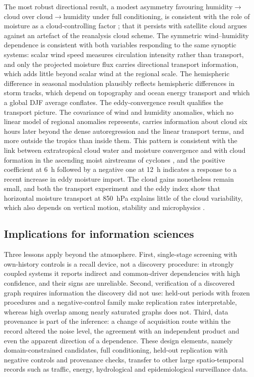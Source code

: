 \documentclass[preprint,12pt]{elsarticle}
\begin{document}
The most robust directional result, a modest asymmetry favouring humidity$\rightarrow$cloud over cloud$\rightarrow$humidity under full conditioning, is consistent with the role of moisture as a cloud-controlling factor \citep{Andersen2023CloudSensitivities}; that it persists with satellite cloud argues against an artefact of the reanalysis cloud scheme. The symmetric wind--humidity dependence is consistent with both variables responding to the same synoptic systems: scalar wind speed measures circulation intensity rather than transport, and only the projected moisture flux carries directional transport information, which adds little beyond scalar wind at the regional scale. The hemispheric difference in seasonal modulation plausibly reflects hemispheric differences in storm tracks, which depend on topography and ocean energy transport \citep{Shaw2022Stormier} and which a global DJF average conflates. The eddy-convergence result qualifies the transport picture. The covariance of wind and humidity anomalies, which no linear model of regional anomalies represents, carries information about cloud six hours later beyond the dense autoregression and the linear transport terms, and more outside the tropics than inside them. This pattern is consistent with the link between extratropical cloud water and moisture convergence \citep{McCoy2022Extratropical} and with cloud formation in the ascending moist airstreams of cyclones \citep{Heitmann2024WCB}, and the positive coefficient at 6~h followed by a negative one at 12~h indicates a response to a recent increase in eddy moisture import. The cloud gains nonetheless remain small, and both the transport experiment and the eddy index show that horizontal moisture transport at 850~hPa explains little of the cloud variability, which also depends on vertical motion, stability and microphysics \citep{WilsonKemsley2024HighCloud}.

\subsection{Implications for information sciences}

Three lessons apply beyond the atmosphere. First, single-stage screening with own-history controls is a recall device, not a discovery procedure: in strongly coupled systems it reports indirect and common-driver dependencies with high confidence, and their signs are unreliable. Second, verification of a discovered graph requires information the discovery did not use: held-out periods with frozen procedures and a negative-control family make replication rates interpretable, whereas high overlap among nearly saturated graphs does not. Third, data provenance is part of the inference: a change of acquisition route within the record altered the noise level, the agreement with an independent product and even the apparent direction of a dependence. These design elements, namely domain-constrained candidates, full conditioning, held-out replication with negative controls and provenance checks, transfer to other large spatio-temporal records such as traffic, energy, hydrological and epidemiological surveillance data.
\end{document}
